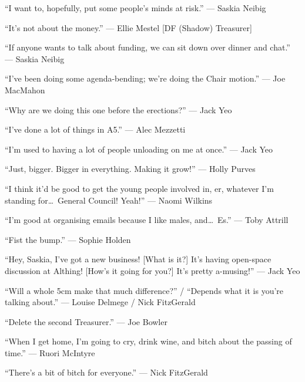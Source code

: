 \documentclass[a4paper, 11pt]{article} %
\begin{document}
``I want to, hopefully, put some people's minds at risk.'' --- Saskia Neibig

``It's not about the money.'' --- Ellie Mestel [DF (Shadow) Treasurer]

``If anyone wants to talk about funding, we can sit down over dinner and chat.'' --- Saskia Neibig

``I've been doing some agenda-bending; we're doing the Chair motion.'' --- Joe MacMahon

``Why are we doing this one before the erections?'' --- Jack Yeo

``I've done a lot of things in A5.'' --- Alec Mezzetti

``I'm used to having a lot of people unloading on me at once.'' --- Jack Yeo

``Just, bigger.  Bigger in everything.  Making it grow!'' --- Holly Purves

``I think it'd be good to get the young people involved in, er, whatever I'm standing for\ldots~General Council! Yeah!'' --- Naomi Wilkins

``I'm good at organising emails because I like males, and\ldots~Es.'' --- Toby Attrill

``Fist the bump.'' --- Sophie Holden

``Hey, Saskia, I've got a new business! [What is it?]  It's having open-space discussion at Althing! [How's it going for you?]  It's pretty a-musing!'' --- Jack Yeo

``Will a whole 5cm make that much difference?'' / ``Depends what it is you're talking about.'' --- Louise Delmege / Nick FitzGerald

``Delete the second Treasurer.'' --- Joe Bowler

``When I get home, I'm going to cry, drink wine, and bitch about the passing of time.'' --- Ruori McIntyre

``There's a bit of bitch for everyone.'' --- Nick FitzGerald

\end{document}
